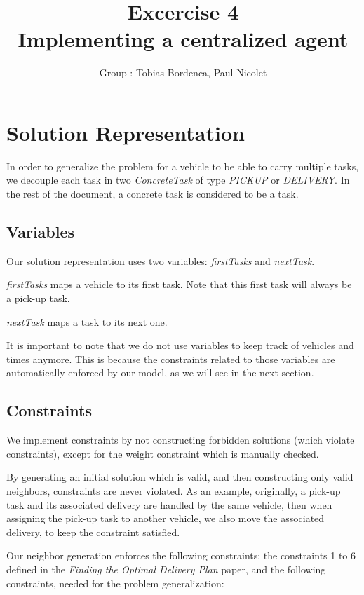 \documentclass[11pt]{article}
\title{\bf Excercise 4\\ Implementing a centralized agent}
\author{Group \textnumero 1: Tobias Bordenca, Paul Nicolet}
\begin{document}
\maketitle

\section{Solution Representation}
In order to generalize the problem for a vehicle to be able to carry multiple tasks, we decouple each task in two \textit{ConcreteTask} of type \textit{PICKUP} or \textit{DELIVERY}. In the rest of the document, a concrete task is considered to be a task.

\subsection{Variables}
Our solution representation uses two variables: \textit{firstTasks} and \textit{nextTask}.

\textit{firstTasks} maps a vehicle to its first task. Note that this first task will always be a pick-up task.

\textit{nextTask} maps a task to its next one.

It is important to note that we do not use variables to keep track of vehicles and times anymore. This is because the constraints related to those variables are automatically enforced by our model, as we will see in the next section.

\subsection{Constraints}
We implement constraints by not constructing forbidden solutions (which violate constraints), except for the weight constraint which is manually checked. 

By generating an initial solution which is valid, and then constructing only valid neighbors, constraints are never violated. As an example, originally, a pick-up task and its associated delivery are handled by the same vehicle, then when assigning the pick-up task to another vehicle, we also move the associated delivery, to keep the constraint satisfied.

Our neighbor generation enforces the following constraints: the constraints 1 to 6 defined in the \textit{Finding the Optimal Delivery Plan} paper, and the following constraints, needed for the problem generalization: 
\end{document}
